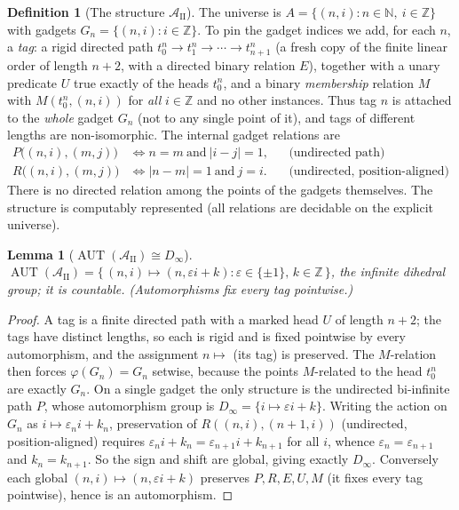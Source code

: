 \documentclass[12pt,fullpage]{article}
\newtheorem{lemma}[theorem]{Lemma}
\theoremstyle{definition}
\newtheorem{definition}[theorem]{Definition}
\newcommand{\A}{\mathcal{A}}
\newcommand{\N}{\mathbb{N}}
\newcommand{\Z}{{\mathbb{Z}}}
\newcommand{\AUT}{\operatorname{AUT}}
\renewcommand{\phi}{\varphi}
\begin{document}
\begin{definition}[The structure $\A_{\mathrm{II}}$]\label{def:AII}
The universe is $A=\{(n,i):n\in\N,\ i\in\Z\}$ with gadgets $G_n=\{(n,i):i\in\Z\}$.
To pin the gadget indices we add, for each $n$, a \emph{tag}: a rigid directed
path $t^n_0\to t^n_1\to\cdots\to t^n_{n+1}$ (a fresh copy of the finite linear
order of length $n+2$, with a directed binary relation $E$), together with a
unary predicate $U$ true exactly of the heads $t^n_0$, and a binary
\emph{membership} relation $M$ with $M(t^n_0,(n,i))$ for \emph{all} $i\in\Z$ and
no other instances.  Thus tag $n$ is attached to the \emph{whole} gadget $G_n$
(not to any single point of it), and tags of different lengths are
non-isomorphic.  The internal gadget relations are
\begin{align*}
P\bigl((n,i),(m,j)\bigr)&\iff n=m\ \text{and}\ |i-j|=1,&&\text{(undirected path)}\\
R\bigl((n,i),(m,j)\bigr)&\iff |n-m|=1\ \text{and}\ j=i.&&\text{(undirected, position-aligned)}
\end{align*}
There is no directed relation among the points of the gadgets themselves.  The
structure is computably represented (all relations are decidable on the explicit
universe).
\end{definition}

\begin{lemma}[$\AUT(\A_{\mathrm{II}})\cong D_\infty$]\label{lem:AII-aut}
$\AUT(\A_{\mathrm{II}})=\{\,(n,i)\mapsto(n,\varepsilon i+k):\varepsilon\in\{\pm1\},\,k\in\Z\,\}$,
the infinite dihedral group; it is countable.  (Automorphisms fix every tag
pointwise.)
\end{lemma}

\begin{proof}
A tag is a finite directed path with a marked head $U$ of length $n+2$; the tags
have distinct lengths, so each is rigid and is fixed pointwise by every
automorphism, and the assignment $n\mapsto$ (its tag) is preserved.  The
$M$-relation then forces $\phi(G_n)=G_n$ setwise, because the points $M$-related
to the head $t^n_0$ are exactly $G_n$.  On a single gadget the only structure is
the undirected bi-infinite path $P$, whose automorphism group is
$D_\infty=\{i\mapsto\varepsilon i+k\}$.  Writing the action on $G_n$ as
$i\mapsto\varepsilon_n i+k_n$, preservation of $R((n,i),(n+1,i))$ (undirected,
position-aligned) requires $\varepsilon_n i+k_n=\varepsilon_{n+1}i+k_{n+1}$ for
all $i$, whence $\varepsilon_n=\varepsilon_{n+1}$ and $k_n=k_{n+1}$.  So the sign
and shift are global, giving exactly $D_\infty$.  Conversely each global
$(n,i)\mapsto(n,\varepsilon i+k)$ preserves $P,R,E,U,M$ (it fixes every tag
pointwise), hence is an automorphism.
\end{proof}
\end{document}
